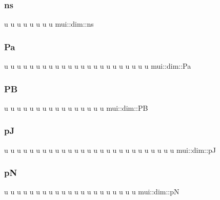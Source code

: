 \mbox{\label{namespacemui_1_1dim_a7431e2ecfb6ef10c86f9483d56f71517}} 
\subsubsection{\texorpdfstring{ns}{ns}}
{\footnotesize\ttfamily u u u u u u u u mui\+::dim\+::ns}

\mbox{\label{namespacemui_1_1dim_ab7b0341ec845d198c905871112957c63}} 
\subsubsection{\texorpdfstring{Pa}{Pa}}
{\footnotesize\ttfamily u u u u u u u u u u u u u u u u u u u u u u u mui\+::dim\+::\+Pa}

\mbox{\label{namespacemui_1_1dim_a4c63556da0b02027507e087bdccad5db}} 
\subsubsection{\texorpdfstring{PB}{PB}}
{\footnotesize\ttfamily u u u u u u u u u u u u u u u u mui\+::dim\+::\+PB}

\mbox{\label{namespacemui_1_1dim_a61a8c4d0743f6ff2d66735b4a8863b6d}} 
\subsubsection{\texorpdfstring{pJ}{pJ}}
{\footnotesize\ttfamily u u u u u u u u u u u u u u u u u u u u u u u u u u u mui\+::dim\+::pJ}

\mbox{\label{namespacemui_1_1dim_a9c7ee642d5f22288d38e9572cf4049e6}} 
\subsubsection{\texorpdfstring{pN}{pN}}
{\footnotesize\ttfamily u u u u u u u u u u u u u u u u u u u u u mui\+::dim\+::pN}

